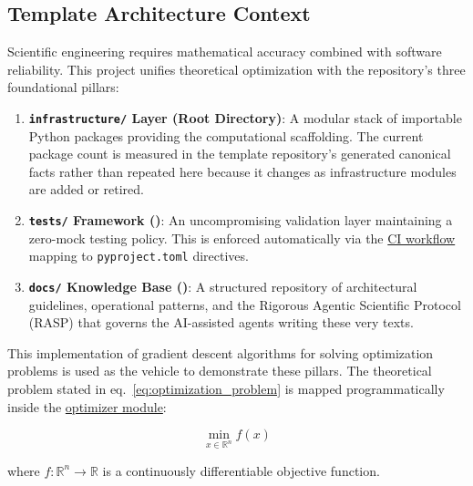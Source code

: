 \documentclass[
  english,
]{article}
\providecommand{\tightlist}{%
  \setlength{\itemsep}{0pt}\setlength{\parskip}{0pt}}
\begin{document}
\subsection{Template Architecture
Context}\label{template-architecture-context}

Scientific engineering requires mathematical accuracy combined with
software reliability. This project unifies theoretical optimization with
the repository's three foundational pillars:

\begin{enumerate}
\def\labelenumi{\arabic{enumi}.}
\tightlist
\item
  \textbf{\texttt{infrastructure/} Layer (Root Directory)}: A modular
  stack of importable Python packages providing the computational
  scaffolding. The current package count is measured in the template
  repository's generated canonical facts rather than repeated here
  because it changes as infrastructure modules are added or retired.
\item
  \textbf{\texttt{tests/} Framework
  ()}: An
  uncompromising validation layer maintaining a zero-mock testing
  policy. This is enforced automatically via the
  \href{https://github.com/docxology/template/blob/main/.github/workflows/ci.yml}{CI
  workflow} mapping to \texttt{pyproject.toml} directives.
\item
  \textbf{\texttt{docs/} Knowledge Base
  ()}: A
  structured repository of architectural guidelines, operational
  patterns, and the Rigorous Agentic Scientific Protocol (RASP) that
  governs the AI-assisted agents writing these very texts.
\end{enumerate}

This implementation of gradient descent algorithms for solving
optimization problems is used as the vehicle to demonstrate these
pillars. The theoretical problem stated in
eq.~\ref{eq:optimization_problem} is mapped programmatically inside the
\href{https://github.com/docxology/template/blob/main/projects/templates/template_code_project/src/optimizer.py}{optimizer
module}:

\begin{equation}
\label{eq:optimization_problem}
\min_{x \in \mathbb{R}^n} f(x)
\end{equation}

where \(f: \mathbb{R}^n \rightarrow \mathbb{R}\) is a continuously
differentiable objective function.
\end{document}
